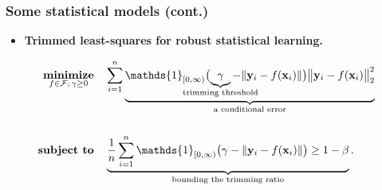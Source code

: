 \documentclass[aspectratio=169,xcolor=dvipsnames]{beamer}
\begin{document}
\begin{frame}
  \frametitle{Some statistical models
    {\normalsize\mdseries (cont.)}}

  \small
  \setlength{\abovedisplayskip}{6pt}
  \setlength{\belowdisplayskip}{6pt}

  \begin{itemize}
    \item \textbf{Trimmed least-squares for robust statistical learning.}
  \end{itemize}

  \[
    \begin{aligned}
      \operatorname*{\textbf{minimize}}_{f\in\mathcal{F};\,\gamma\geq0}\quad
      &\sum_{i=1}^{n}\underbrace{\mathds{1}_{[0,\infty)}\bigl(
         \underbrace{\gamma}_{\mathclap{\text{trimming threshold}}}
         -\|\mathbf{y}_i-f(\mathbf{x}_i)\|\bigr)
         \bigl\|\mathbf{y}_i-f(\mathbf{x}_i)\bigr\|_2^2}_
         {\text{a conditional error}}\\[16pt]
      \operatorname*{\textbf{subject to}}\quad
      &\underbrace{\frac{1}{n}\sum_{i=1}^{n}\mathds{1}_{[0,\infty)}\bigl(
         \gamma-\|\mathbf{y}_i-f(\mathbf{x}_i)\|\bigr)\geq 1-\beta}_
         {\text{bounding the trimming ratio}}.
    \end{aligned}
  \]
\end{frame}
\end{document}
